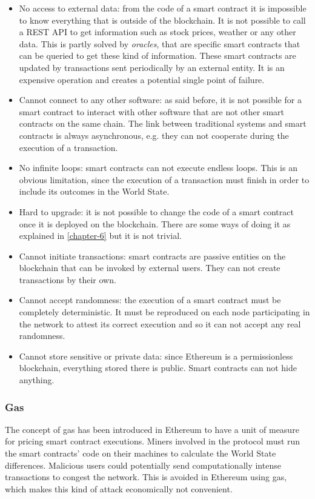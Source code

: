 \begin{itemize}
    \item No access to external data: from the code of a smart contract it is impossible to know everything that is outside of the blockchain. It is not possible to call a REST API to get information such as stock prices, weather or any other data. This is partly solved by \textit{oracles}, that are specific smart contracts that can be queried to get these kind of information. These smart contracts are updated by transactions sent periodically by an external entity. It is an expensive operation and creates a potential single point of failure.
    \item Cannot connect to any other software: as said before, it is not possible for a smart contract to interact with other software that are not other smart contracts on the same chain. The link between traditional systems and smart contracts is always asynchronous, e.g. they can not cooperate during the execution of a transaction.
    \item No infinite loops: smart contracts can not execute endless loops. This is an obvious limitation, since the execution of a transaction must finish in order to include its outcomes in the World State.
    \item Hard to upgrade: it is not possible to change the code of a smart contract once it is deployed on the blockchain. There are some ways of doing it as explained in \cref{chapter-6} but it is not trivial. 
    \item Cannot initiate transactions: smart contracts are passive entities on the blockchain that can be invoked by external users. They can not create transactions by their own.
    \item Cannot accept randomness: the execution of a smart contract must be completely deterministic. It must be reproduced on each node participating in the network to attest its correct execution and so it can not accept any real randomness.
    \item  Cannot store sensitive or private data: since Ethereum is a permissionless blockchain, everything stored there is public. Smart contracts can not hide anything. 
\end{itemize}

\subsubsection{Gas}

The concept of gas has been introduced in Ethereum to have a unit of measure for pricing smart contract executions. Miners involved in the protocol must run the smart contracts' code on their machines to calculate the World State differences. Malicious users could potentially send computationally intense transactions to congest the network. This is avoided in Ethereum using gas, which makes this kind of attack economically not convenient.

